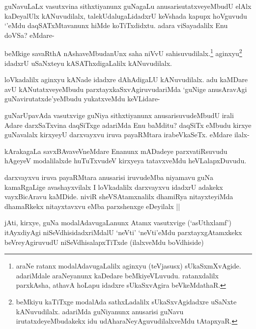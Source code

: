 
\begin{artha}
guNavuLaLx vasutxvina sithxtiyanunx guNagaLu anusarisutatxveyeMbudU elAlx kaDeyalUlx kANuvudilalx, talekUdalugaLidadxrU keVshada kapupx hoVguvudu `\stext'eMdu daqSATxMtavanunx hiMde koTiTxdidxtu. adara viSayadalilx Enu doVSa? eMdare-
\end{artha}

\begin{artha}
beMkige savaRthA nAshaveMbudanUnx saha niVvU sahisuvudilalx.\footnote{araNe ratanx modalAdavugaLalilx aginxyu (teVjasusx) sUkaSxmXvAgide. adariMdale araNeyanunx kaDedare beMkiyeVLuvudu. ratanxdalilx parxkAsha, athavA hoLapu idadxre sUkaSxvAgira beVkeMdathaR.} aginxyu\footnote{beMkiyu kaTiTxge modalAda sathxLadalilx sUkaSxvAgidadxre uSaNxte kANuvudilalx. adariMda guNiyanunx anusarisi guNavu irutatxdeyeMbudakekx idu udAharaNeyAguvudilalxveMdu tAtapxyaR.} idadxrU uSaNxteyu kASAThxdigaLalilx kANuvudilalx.
\end{artha}

\begin{artha}
loVkadalilx aginxyu kANade idadxre dAhAdigaLU kANuvudilalx. adu kaMDare avU kANutatxveyeMbudu parxtayxkaSxvAgiruvudariMda `guNige anusAravAgi guNavirutatxde'yeMbudu yukatxveMdu keVLidare-
\end{artha}

\begin{artha}
guNarUpavAda vasutxvige guNiya sithxtiyanunx anusarisuvudeMbudU irali Adare darxSaTxvina daqSiTxge adariMda Enu baMditu? daqSiTx eMbudu kirxye guNavalalx kirxyeyU darxvayxvu iruva payaRMtara irabeVkaSeTx. eMdare ilalx-
\end{artha}

\begin{artha}
kArakagaLa savxBAvaveVneMdare Enanunx mADadeye parxvatiRsuvudu hAgeyeV modalilalxde huTuTxvudeV kirxyeya tatavxveMdu heVLalapxDuvudu.
\end{artha}

\begin{artha}
darxvayxvu iruva payaRMtara anusarisi iruvudeMba niyamavu guNa kamaRgaLige avashayxvilalx I loVkadalilx darxvayxvu idadxrU adakekx vayxBicAravu kaMDide. niviR sheVSAtamxnalilx dhamiRya nitayxteyiMda dhamaRkekx nitayxtavxvu eMba parxshenxge eDeyilalx ||
\end{artha}

\begin{artha}
jAti, kirxye, guNa modalAdavugaLanunx Atamx vasutxvige (`asUthxlamf') itAyxdiyAgi niSeVdhisidadxriMdalU `neVti' `neVti'eMdu parxtayxgAtamxkekx beVreyAgiruvudU niSeVdhisalapxTiTxde (ilalxveMdu boVdhiside) 
\end{artha}

